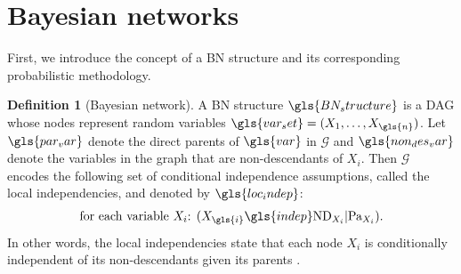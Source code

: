 \documentclass[a4paper, twoside, 11pt]{report}
\theoremstyle{plain}
\theoremstyle{definition}
\newtheorem{definition}[thm]{Definition}
\theoremstyle{remark}
\newcommand{\G}{{\mathcal G}}
\begin{document}
\section{Bayesian networks}
First, we introduce the concept of a BN structure and its corresponding probabilistic methodology.
\begin{definition}[Bayesian network]
A \gls{BN} structure $\gls{BN_structure}$ is a \gls{DAG} whose nodes represent random variables $\gls{var_set} = (X_1, \ldots , X_{\gls{n}})$. Let $\gls{par_var}$ denote the direct parents of $\gls{var}$ in $\G$ and $\gls{non_des_var}$ denote the variables in the graph that are non-descendants of $X_i$. Then $\G$ encodes the following set of conditional independence assumptions, called the local independencies, and denoted by $\gls{loc_indep}$:
\begin{align*}
\text{for each variable $X_i$: $(X_{\gls{i}} \gls{indep} \text{ND}_{X_i} | \text{Pa}_{X_i})$}.
\end{align*}
In other words, the local independencies state that each node $X_i$ is conditionally independent of its non-descendants given its parents \citep[p.~57]{koller2009probabilistic}.
\end{definition}
\end{document}

